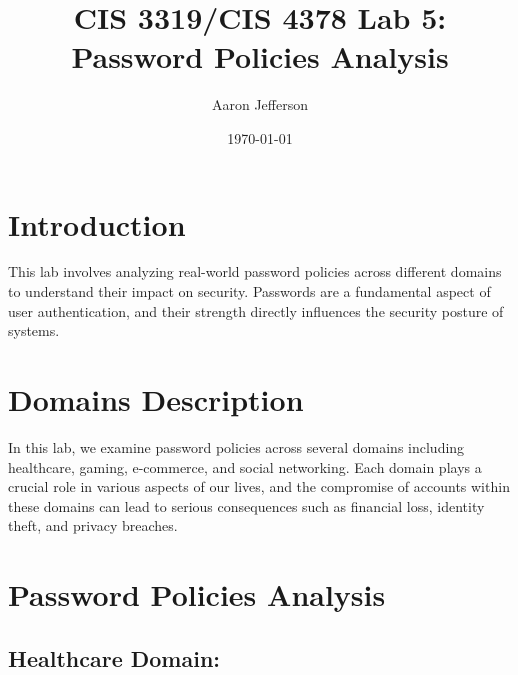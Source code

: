 \documentclass{article}
\title{CIS 3319/CIS 4378 Lab 5: Password Policies Analysis}
\author{Aaron Jefferson}
\date{\today}
\begin{document}
\maketitle

\section{Introduction}
This lab involves analyzing real-world password policies across different domains to understand their impact on security. Passwords are a fundamental aspect of user authentication, and their strength directly influences the security posture of systems.

\section{Domains Description}
In this lab, we examine password policies across several domains including healthcare, gaming, e-commerce, and social networking. Each domain plays a crucial role in various aspects of our lives, and the compromise of accounts within these domains can lead to serious consequences such as financial loss, identity theft, and privacy breaches.

\section{Password Policies Analysis}

\subsection*{Healthcare Domain:}
\end{document}
